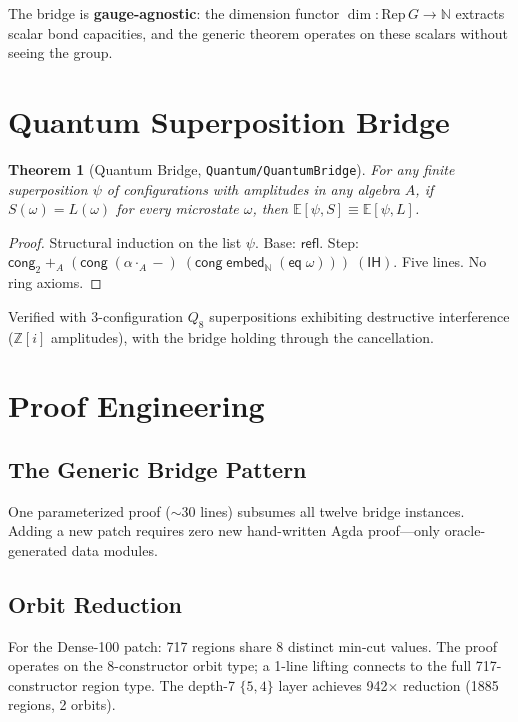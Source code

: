 \documentclass[11pt,a4paper]{article}
\newtheorem{theorem}{Theorem}[section]
\newcommand{\N}{\mathbb{N}}
\newcommand{\Qi}{\mathbb{Z}[i]}
\newcommand{\refl}{\mathsf{refl}}
\newcommand{\module}[1]{\texttt{#1}}
\begin{document}
The bridge is \textbf{gauge-agnostic}: the dimension functor
$\dim : \mathrm{Rep}\, G \to \N$ extracts scalar bond capacities,
and the generic theorem operates on these scalars without seeing
the group.

\section{Quantum Superposition Bridge}
\label{sec:quantum}

\begin{theorem}[Quantum Bridge, \module{Quantum/QuantumBridge}]
\label{thm:quantum}
For any finite superposition $\psi$ of configurations with
amplitudes in any algebra $A$, if $S(\omega) = L(\omega)$ for every
microstate $\omega$, then $\mathbb{E}[\psi, S] \equiv
\mathbb{E}[\psi, L]$.
\end{theorem}

\begin{proof}
Structural induction on the list $\psi$.  Base: $\refl$.
Step: $\mathsf{cong}_2\; {+_A}\;
(\mathsf{cong}\; (\alpha \cdot_A {-})\;
(\mathsf{cong}\; \mathsf{embed}_\N\; (\mathsf{eq}\; \omega)))\;
(\mathsf{IH})$.
Five lines.  No ring axioms.
\end{proof}

Verified with 3-configuration $Q_8$ superpositions exhibiting
destructive interference ($\Qi$ amplitudes), with the bridge
holding through the cancellation.

\section{Proof Engineering}
\label{sec:engineering}

\subsection{The Generic Bridge Pattern}
One parameterized proof ($\sim$30 lines) subsumes all twelve
bridge instances.  Adding a new patch requires zero new hand-written
Agda proof---only oracle-generated data modules.

\subsection{Orbit Reduction}
For the Dense-100 patch: 717 regions share 8 distinct min-cut
values.  The proof operates on the 8-constructor orbit type; a
1-line lifting connects to the full 717-constructor region type.
The depth-7 $\{5,4\}$ layer achieves 942$\times$ reduction (1885
regions, 2 orbits).
\end{document}
